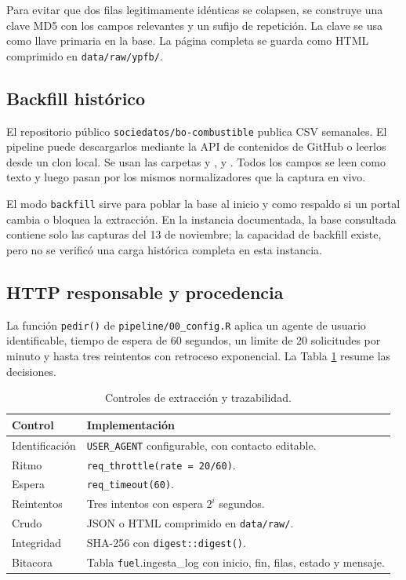 \documentclass[12pt,a4paper]{article}
\newcommand{\fuel}{\texttt{fuel}}
\newcommand{\archivo}[1]{\texttt{#1}}
\begin{document}
Para evitar que dos filas legitimamente idénticas se colapsen, se construye una clave MD5 con los campos relevantes y un sufijo de repetición. La clave se usa como llave primaria en la base. La página completa se guarda como HTML comprimido en \texttt{data/raw/ypfb/}.

\subsection{Backfill histórico}

El repositorio público \texttt{sociedatos/bo-combustible} publica CSV semanales. El pipeline puede descargarlos mediante la API de contenidos de GitHub o leerlos desde un clon local. Se usan las carpetas  y ,  y . Todos los campos se leen como texto y luego pasan por los mismos normalizadores que la captura en vivo.

El modo \texttt{backfill} sirve para poblar la base al inicio y como respaldo si un portal cambia o bloquea la extracción. En la instancia documentada, la base consultada contiene solo las capturas del 13 de noviembre; la capacidad de backfill existe, pero no se verificó una carga histórica completa en esta instancia.

\subsection{HTTP responsable y procedencia}

La función \texttt{pedir()} de \archivo{pipeline/00\_config.R} aplica un agente de usuario identificable, tiempo de espera de 60 segundos, un limite de 20 solicitudes por minuto y hasta tres reintentos con retroceso exponencial. La Tabla \ref{tab:http} resume las decisiones.

\begin{table}[H]
\centering
\small
\caption{Controles de extracción y trazabilidad.}
\label{tab:http}
\begin{tabularx}{\linewidth}{@{}l X@{}}
\toprule
\textbf{Control} & \textbf{Implementación} \\
\midrule
Identificación & \texttt{USER\_AGENT} configurable, con contacto editable. \\
Ritmo & \texttt{req\_throttle(rate = 20/60)}. \\
Espera & \texttt{req\_timeout(60)}. \\
Reintentos & Tres intentos con espera \(2^i\) segundos. \\
Crudo & JSON o HTML comprimido en \texttt{data/raw/}. \\
Integridad & SHA-256 con \texttt{digest::digest()}. \\
Bitacora & Tabla \fuel.ingesta\_log con inicio, fin, filas, estado y mensaje. \\
\bottomrule
\end{tabularx}
\end{table}
\end{document}
